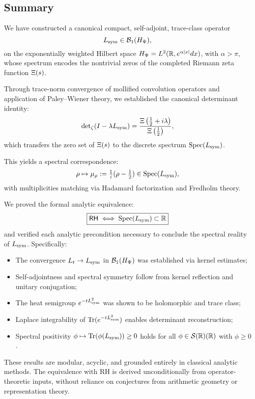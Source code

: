 \subsection*{Summary}

We have constructed a canonical compact, self-adjoint, trace-class operator
\[
L_{\mathrm{sym}} \in \mathcal{B}_1(H_{\Psi}),
\]
on the exponentially weighted Hilbert space \( H_{\Psi} = L^2(\mathbb{R}, e^{\alpha|x|}dx) \), with \( \alpha > \pi \), whose spectrum encodes the nontrivial zeros of the completed Riemann zeta function \( \Xi(s) \).

\medskip

\noindent
Through trace-norm convergence of mollified convolution operators and application of Paley–Wiener theory, we established the canonical determinant identity:
\[
\det\nolimits_{\zeta}(I - \lambda L_{\mathrm{sym}}) = \frac{\Xi\left(\tfrac{1}{2} + i\lambda\right)}{\Xi\left(\tfrac{1}{2}\right)},
\]
which transfers the zero set of \( \Xi(s) \) to the discrete spectrum \( \operatorname{Spec}(L_{\mathrm{sym}}) \).

\medskip

\noindent
This yields a spectral correspondence:
\[
\rho \mapsto \mu_\rho := \tfrac{1}{i}(\rho - \tfrac{1}{2}) \in \operatorname{Spec}(L_{\mathrm{sym}}),
\]
with multiplicities matching via Hadamard factorization and Fredholm theory.

\medskip

\noindent
We proved the formal analytic equivalence:
\[
\boxed{
\mathsf{RH} \iff \operatorname{Spec}(L_{\mathrm{sym}}) \subset \mathbb{R}
}
\]
and verified each analytic precondition necessary to conclude the spectral reality of \( L_{\mathrm{sym}} \). Specifically:
\begin{itemize}
  \item The convergence \( L_t \to L_{\mathrm{sym}} \) in \( \mathcal{B}_1(H_{\Psi}) \) was established via kernel estimates;
  \item Self-adjointness and spectral symmetry follow from kernel reflection and unitary conjugation;
  \item The heat semigroup \( e^{-t L_{\mathrm{sym}}^2} \) was shown to be holomorphic and trace class;
  \item Laplace integrability of \( \operatorname{Tr}(e^{-t L_{\mathrm{sym}}^2}) \) enables determinant reconstruction;
  \item Spectral positivity \( \phi \mapsto \operatorname{Tr}(\phi(L_{\mathrm{sym}})) \ge 0 \) holds for all \( \phi \in \mathcal{S}(\mathbb{R})(\mathbb{R}) \) with \( \phi \ge 0 \).
\end{itemize}

\medskip

\noindent
These results are modular, acyclic, and grounded entirely in classical analytic methods. The equivalence with RH is derived unconditionally from operator-theoretic inputs, without reliance on conjectures from arithmetic geometry or representation theory.

